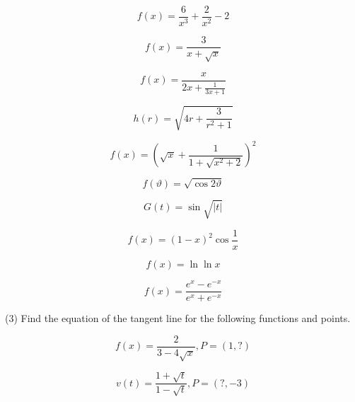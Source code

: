 \documentclass[11pt]{article}
\begin{document}
\begin{equation}
  \label{eq:xaumaezi}
  f(x)=\frac{6}{x^{3}}+\frac{2}{x^{2}}-2
\end{equation}

\begin{equation}
  \label{eq:utazeafa}
  f(x)=\frac{3}{x+\sqrt{x}}
\end{equation}

\begin{equation}
  \label{eq:feivooch}
  f(x)=\frac{x}{2x+\frac{1}{3x+1}}
\end{equation}

\begin{equation}
  \label{eq:feeraiva}
  h(r)=\sqrt{4r+\frac{3}{r^{2}+1}}
\end{equation}

\begin{equation}
  \label{eq:siebaish}
  f(x)=\left(\sqrt{x}+\frac{1}{1+\sqrt{x^{2}+2}}\right)^{2}
\end{equation}

\begin{equation}
  \label{eq:feiveloh}
  f(\vartheta)=\sqrt{\cos{}2\vartheta}
\end{equation}

\begin{equation}
  \label{eq:oifahtie}
  G(t)=\sin\sqrt{\vert{}t\vert}
\end{equation}

\begin{equation}
  \label{eq:isaithar}
  f(x)=(1-x)^{2}\cos\frac{1}{x}
\end{equation}

\begin{equation}
  \label{eq:ixoathat}
  f(x)=\ln\ln{}x
\end{equation}

\begin{equation}
  \label{eq:airougof}
  f(x)=\frac{e^{x}-e^{-x}}{e^{x}+e^{-x}}
\end{equation}

(3) Find the equation of the tangent line for the following functions
and points.

\begin{equation}
  \label{eq:fiedaghe}
  f(x)=\frac{2}{3-4\sqrt{x}}, P=(1,?)
\end{equation}

\begin{equation}
  \label{eq:oozeewai}
  v(t)=\frac{1+\sqrt{t}}{1-\sqrt{t}}, P=(?,-3)
\end{equation}
\end{document}
